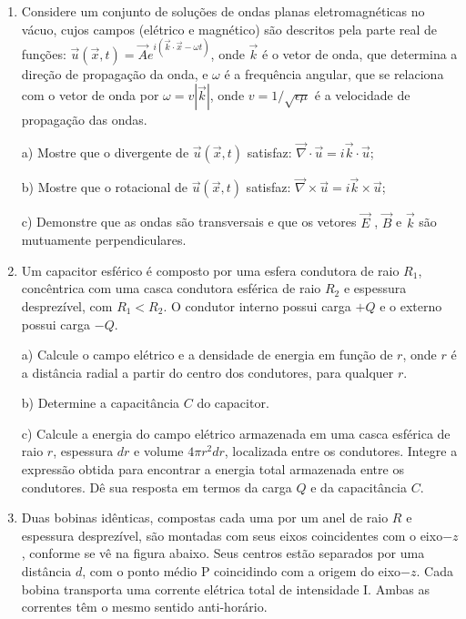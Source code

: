 \begin{enumerate}[start=1,label={\bfseries Q\arabic*.}]
\resposta



\item Considere um conjunto de soluções de ondas planas eletromagnéticas no vácuo, cujos campos (elétrico e magnético) são descritos pela parte real de funções: $\vec{u}(\vec{x},t) = \vec{A}e^{i(\vec{k} \cdot \vec{x} - \omega t)}$, onde $\vec{k}$ é o vetor de onda, que determina a direção de propagação da onda, e $\omega$ é a frequência angular, que se relaciona com o vetor de onda por $\omega = v |\vec{k}|$, onde $v = 1 / \sqrt{\epsilon \mu}$ é a velocidade de propagação das ondas.


a) Mostre que o divergente de $\vec{u}(\vec{x},t)$ satisfaz: $\vec{\nabla} \cdot \vec{u} = i \vec{k} \cdot \vec{u}$;

\resposta

b) Mostre que o rotacional de $\vec{u}(\vec{x},t)$ satisfaz: $\vec{\nabla} \times \vec{u} = i \vec{k} \times \vec{u}$;

\resposta

c) Demonstre que as ondas são transversais e que os vetores $\vec{E}$ , $\vec{B}$ e $\vec{k}$ são mutuamente perpendiculares.

\resposta



\item Um capacitor esférico é composto por uma esfera condutora de raio $R_{1}$, concêntrica com uma casca condutora esférica de raio $R_{2}$ e espessura desprezível, com $R_{1} < R_{2}$. O condutor interno possui carga $+Q$ e o externo possui carga $-Q$.


a) Calcule o campo elétrico e a densidade de energia em função de $r$, onde $r$ é a distância radial a partir do centro dos condutores, para qualquer $r$.

\resposta

b) Determine a capacitância $C$ do capacitor.

\resposta

c) Calcule a energia do campo elétrico armazenada em uma casca esférica de raio $r$, espessura $dr$ e volume $4\pi r^{2}dr$, localizada entre os condutores. Integre a expressão obtida para encontrar a energia total armazenada entre os condutores. Dê sua resposta em termos da carga $Q$ e da capacitância $C$.

\resposta


\item Duas bobinas idênticas, compostas cada uma por um anel de raio $R$ e espessura desprezível, são montadas com seus eixos coincidentes com o eixo$-z$, conforme se vê na figura abaixo. Seus centros estão separados por uma distância $d$, com o ponto médio P coincidindo com a origem do eixo$-z$. Cada bobina transporta uma corrente elétrica total de intensidade I. Ambas as correntes têm o mesmo sentido anti-horário.



\end{enumerate}
